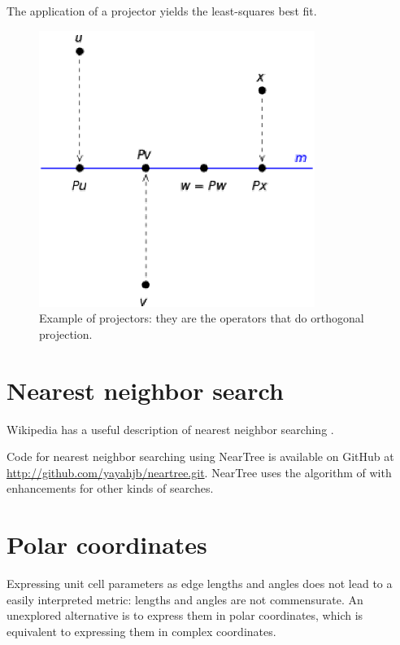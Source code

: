 \documentclass[preprint]{iucr}              %
\numberwithin{equation}{section}
\begin{document}
The application of a projector yields the least-squares best fit.

		
\begin{figure}
				\includegraphics[width=0.8\textwidth]{Orthogonal_projection}

	\caption{Example of projectors: they are the operators that do orthogonal projection.}
\end{figure}
\section{Nearest neighbor search}
\label{nearest}

Wikipedia has a useful description of nearest neighbor searching \cite{enwiki:1103897119}.

Code for nearest neighbor searching using NearTree is available on GitHub
at \url{http://github.com/yayahjb/neartree.git}. NearTree uses the algorithm of
 with enhancements for other kinds of searches. 


\section{Polar coordinates}
\label{polar}

Expressing unit cell parameters as edge lengths and angles does 
not lead to a easily interpreted metric: lengths and angles are
not commensurate. An unexplored alternative is to express them in
polar coordinates, which is equivalent to expressing them in complex
coordinates. 
\end{document}
